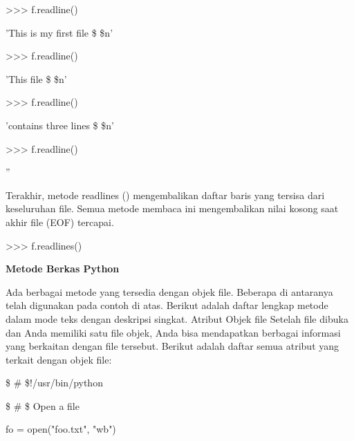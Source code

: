\noindent 
>>> f.readline() \par
\noindent 
'This is my first file \$  \setminus  \$n' \par
\vspace{12pt}
\noindent 
>>> f.readline() \par
\noindent 
'This file \$  \setminus  \$n' \par
\vspace{12pt}
\noindent 
>>> f.readline() \par
\noindent 
'contains three lines \$  \setminus  \$n' \par
\vspace{12pt}
\noindent 
>>> f.readline() \par
\noindent 
'' \par
\vspace{12pt}
Terakhir, metode readlines () mengembalikan daftar baris yang tersisa dari keseluruhan file. Semua metode membaca ini mengembalikan nilai kosong saat akhir file (EOF) tercapai. \par
\vspace{12pt}
\noindent 
>>> f.readlines() \par
{} \par
\vspace{12pt}
\vspace{12pt}
\noindent 
{\fontsize{14pt}{14pt}\selectfont \textbf{Metode Berkas Python} \\} \par
\vspace{12pt}
Ada berbagai metode yang tersedia dengan objek file. Beberapa di antaranya telah digunakan pada contoh di atas. Berikut adalah daftar lengkap metode dalam mode teks dengan deskripsi singkat. Atribut Objek file Setelah file dibuka dan Anda memiliki satu file objek, Anda bisa mendapatkan berbagai informasi yang berkaitan dengan file tersebut. Berikut adalah daftar semua atribut yang terkait dengan objek file: \par
\vspace{12pt}
\vspace{12pt}
\vspace{12pt}
\noindent 
 \$  \#  \$!/usr/bin/python \par
\vspace{12pt}
\noindent 
 \$  \#  \$ Open a file \par
\noindent 
fo = open("foo.txt", "wb") \par
